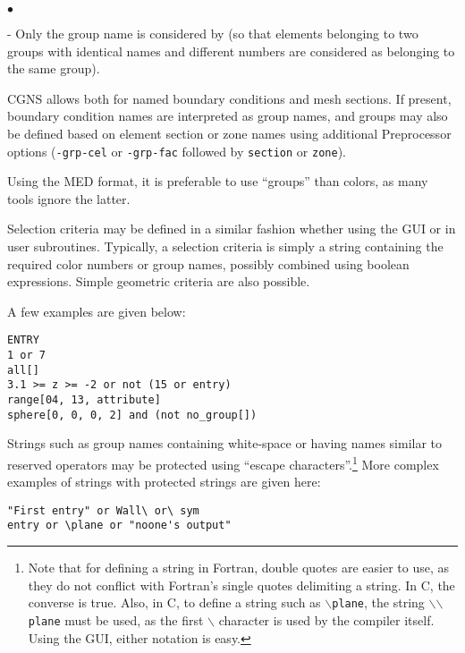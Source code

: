 {{{{\begin{list}{$\bullet$}{}
\begin{list}{-}{}
            Only the group name is considered by \CS (so that elements
            belonging to two groups with identical names and different
            numbers are considered as belonging to the same group).
      \item CGNS allows both for named boundary conditions and mesh
            sections. If present, boundary condition names are
            interpreted as group names, and groups may also be defined
            based on element section or zone names using additional
            Preprocessor options (\texttt{-grp-cel} or
            \texttt{-grp-fac} followed by \texttt{section} or
            \texttt{zone}).
      \item Using the MED format, it is preferable to use ``groups''
            than colors, as many tools ignore the latter.
      \end{list}
\end{list}

Selection criteria may be defined in a similar fashion whether
using the GUI or in user subroutines.
Typically, a selection criteria is simply a string containing
the required color numbers or group names, possibly combined
using boolean expressions. Simple geometric criteria are also
possible.

A few examples are given below:

\verb+ENTRY+\\
\verb+1 or 7+\\
\verb+all[]+\\
\verb+3.1 >= z >= -2 or not (15 or entry)+\\
\verb+range[04, 13, attribute]+\\
\verb+sphere[0, 0, 0, 2] and (not no_group[])+

Strings such as group names containing white-space
or having names similar to reserved operators may be protected
using ``escape characters''.\footnote{Note that for defining a
string in Fortran, double quotes are easier to use, as they do not
conflict with Fortran's single quotes delimiting a string.
In C, the converse is true. Also, in C, to define a string
such as \texttt{{$\backslash$}plane}, the string
\texttt{{$\backslash$}{$\backslash$}plane} must be
used, as the first $\backslash$ character is used by the
compiler itself. Using the GUI, either notation is easy.}
More complex examples of strings with protected strings are given here:

\verb+"First entry" or Wall\ or\ sym+\\
\verb+entry or \plane or "noone's output"+

}}}}
